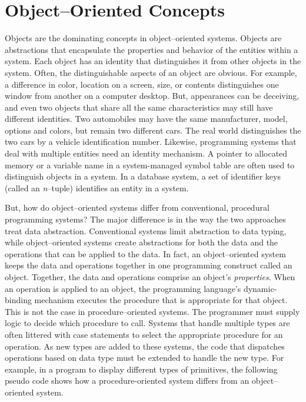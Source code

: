\section{Object--Oriented Concepts}

Objects are the dominating concepts in object--oriented systems. Objects are abstractions that encapsulate the properties and behavior of the entities within a system. Each object has an identity that distinguishes it from other objects in the system. Often, the distinguishable aspects of an object are obvious. For example, a difference in color, location on a screen, size, or contents distinguishes one window from another on a computer desktop. But, appearances can be deceiving, and even two objects that share all the same characteristics may still have different identities. Two automobiles may have the same manufacturer, model, options and colors, but remain two different cars. The real world distinguishes the two cars by a vehicle identification number. Likewise, programming systems that deal with multiple entities need an identity mechanism. A pointer to allocated memory or a variable name in a system-managed symbol table are often used to distinguish objects in a system. In a database system, a set of identifier keys (called an \emph{n}--tuple) identifies an entity in a system.

But, how do object--oriented systems differ from conventional, procedural programming systems? The major difference is in the way the two approaches treat data abstraction. Conventional systems limit abstraction to data typing, while object--oriented systems create abstractions for both the data and the operations that can be applied to the data. In fact, an object--oriented system keeps the data and operations together in one programming construct called an object. Together, the data and operations comprise an object's \emph{properties}. When an operation is applied to an object, the programming language's dynamic-binding mechanism executes the procedure that is appropriate for that object. This is not the case in procedure--oriented systems. The programmer must supply logic to decide which procedure to call. Systems that handle multiple types are often littered with case statements to select the appropriate procedure for an operation. As new types are added to these systems, the code that dispatches operations based on data type must be extended to handle the new type. For example, in a program to display different types of primitives, the following pseudo code shows how a procedure-oriented system differs from an object--oriented system.

